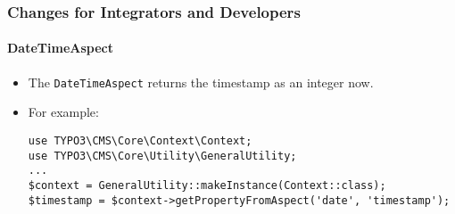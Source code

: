 %

\begin{frame}[fragile]
	\frametitle{Changes for Integrators and Developers}
	\framesubtitle{DateTimeAspect}


	\begin{itemize}
		\item The \texttt{DateTimeAspect} returns the timestamp as an integer now.
		\item For example:
\begin{lstlisting}
use TYPO3\CMS\Core\Context\Context;
use TYPO3\CMS\Core\Utility\GeneralUtility;
...
$context = GeneralUtility::makeInstance(Context::class);
$timestamp = $context->getPropertyFromAspect('date', 'timestamp');
\end{lstlisting}

	\end{itemize}

\end{frame}

